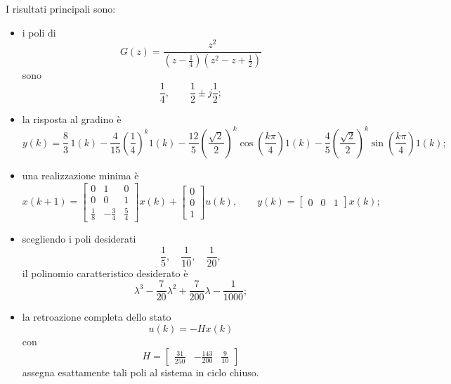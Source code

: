 I risultati principali sono:
\begin{itemize}
    \item i poli di
    \[
    G(z)=\frac{z^2}{\left(z-\frac14\right)\left(z^2-z+\frac12\right)}
    \]
    sono
    \[
    \frac14,\qquad \frac12\pm j\frac12;
    \]

    \item la risposta al gradino è
    \[
    y(k)
    =
    \frac{8}{3}\,1(k)
    -
    \frac{4}{15}\left(\frac14\right)^k 1(k)
    -
    \frac{12}{5}\left(\frac{\sqrt2}{2}\right)^k
    \cos\!\left(\frac{k\pi}{4}\right)1(k)
    -
    \frac{4}{5}\left(\frac{\sqrt2}{2}\right)^k
    \sin\!\left(\frac{k\pi}{4}\right)1(k);
    \]

    \item una realizzazione minima è
    \[
    x(k+1)=
    \begin{bmatrix}
    0 & 1 & 0\\
    0 & 0 & 1\\
    \frac18 & -\frac34 & \frac54
    \end{bmatrix}x(k)
    +
    \begin{bmatrix}
    0\\0\\1
    \end{bmatrix}u(k),
    \qquad
    y(k)=
    \begin{bmatrix}
    0 & 0 & 1
    \end{bmatrix}x(k);
    \]

    \item scegliendo i poli desiderati
    \[
    \frac15,\quad \frac1{10},\quad \frac1{20},
    \]
    il polinomio caratteristico desiderato è
    \[
    \lambda^3-\frac{7}{20}\lambda^2+\frac{7}{200}\lambda-\frac{1}{1000};
    \]

    \item la retroazione completa dello stato
    \[
    u(k)=-H x(k)
    \]
    con
    \[
    H=
    \begin{bmatrix}
    \frac{31}{250} & -\frac{143}{200} & \frac{9}{10}
    \end{bmatrix}
    \]
    assegna esattamente tali poli al sistema in ciclo chiuso.
\end{itemize}